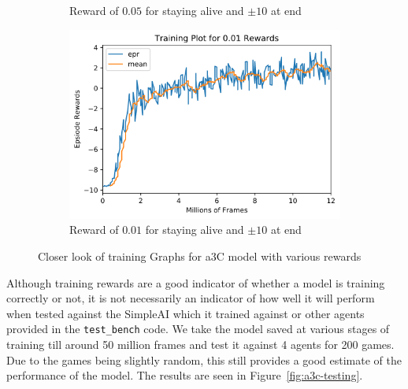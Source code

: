 \begin{figure}[ht!]
\begin{subfigure}{0.49\textwidth}
        \caption{Reward of $0.05$ for staying alive and $\pm 10$ at end}
        \label{fig:training-close-a3c-05}
    \end{subfigure}
    
    \begin{subfigure}{0.49\textwidth}
        \centering
        \includegraphics[width=\textwidth]{figures/a3c-training-0-01_close.png}
        \caption{Reward of $0.01$ for staying alive and $\pm 10$ at end}
        \label{fig:training-close-a3c-01}
    \end{subfigure}
    \caption{Closer look of training Graphs for a3C model with various rewards}
    \label{fig:a3c-training-close}
\end{figure}

Although training rewards are a good indicator of whether a model is training correctly or not, it is not necessarily an indicator of how well it will perform when tested against the SimpleAI which it trained against or other agents provided in the \texttt{test\_bench} code. We take the model saved at various stages of training till around 50 million frames and test it against 4 agents for 200 games. Due to the games being slightly random, this still provides a good estimate of the performance of the model. The results are seen in Figure~\ref{fig:a3c-testing}.

